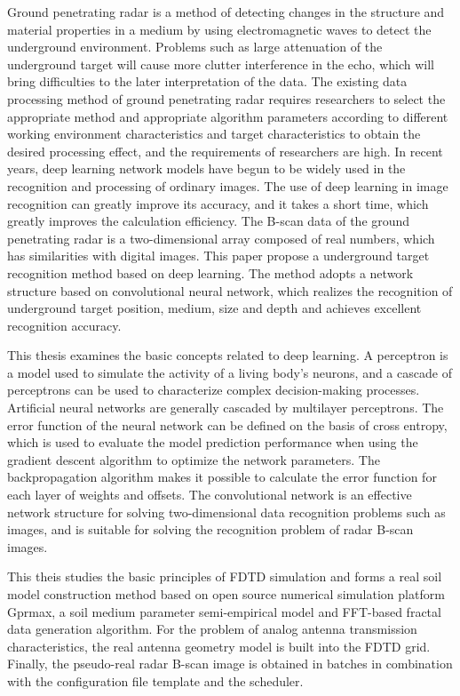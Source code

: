 
\begin{englishabstract}
	Ground penetrating radar is a method of detecting changes in the structure and material properties in a medium by using electromagnetic waves to detect the underground environment. Problems such as large attenuation of the underground target will cause more clutter interference in the echo, which will bring difficulties to the later interpretation of the data. The existing data processing method of ground penetrating radar requires researchers to select the appropriate method and appropriate algorithm parameters according to different working environment characteristics and target characteristics to obtain the desired processing effect, and the requirements of researchers are high. In recent years, deep learning network models have begun to be widely used in the recognition and processing of ordinary images. The use of deep learning in image recognition can greatly improve its accuracy, and it takes a short time, which greatly improves the calculation efficiency. The B-scan data of the ground penetrating radar is a two-dimensional array composed of real numbers, which has similarities with digital images. This paper propose a underground target recognition method based on deep learning. The method adopts a network structure based on convolutional neural network, which realizes the recognition of underground target position, medium, size and depth and achieves excellent recognition accuracy. 
	
	This thesis examines the basic concepts related to deep learning. A perceptron is a model used to simulate the activity of a living body's neurons, and a cascade of perceptrons can be used to characterize complex decision-making processes. Artificial neural networks are generally cascaded by multilayer perceptrons. The error function of the neural network can be defined on the basis of cross entropy, which is used to evaluate the model prediction performance when using the gradient descent algorithm to optimize the network parameters. The backpropagation algorithm makes it possible to calculate the error function for each layer of weights and offsets. The convolutional network is an effective network structure for solving two-dimensional data recognition problems such as images, and is suitable for solving the recognition problem of radar B-scan images. 
	
	This theis studies the basic principles of FDTD simulation and forms a real soil model construction method based on open source numerical simulation platform Gprmax, a soil medium parameter semi-empirical model and FFT-based fractal data generation algorithm. For the problem of analog antenna transmission characteristics, the real antenna geometry model is built into the FDTD grid. Finally, the pseudo-real radar B-scan image is obtained in batches in combination with the configuration file template and the scheduler. 
	

\end{englishabstract}
